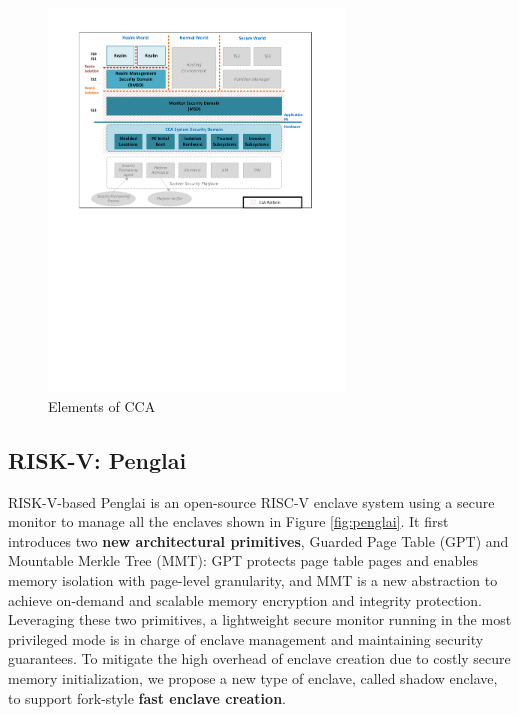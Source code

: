 \documentclass[lang=en]{sjtuarticle}
\begin{document}
\begin{figure}[h]
    \centering
    \includegraphics[width=0.7\textwidth]{cca.pdf}
    \caption{Elements of CCA \cite{armcca}}
    \label{fig:cca}
\end{figure}

\subsection{RISK-V: Penglai}

RISK-V-based Penglai \cite{penglai} is an open-source RISC-V enclave system using
a secure monitor to manage all the enclaves shown in Figure \ref{fig:penglai}. It first introduces two \textbf{new architectural
primitives}, Guarded Page Table (GPT) and Mountable
Merkle Tree (MMT): GPT protects page table pages and
enables memory isolation with page-level granularity, and
MMT is a new abstraction to achieve on-demand and scalable
memory encryption and integrity protection. Leveraging these
two primitives, a lightweight secure monitor running in the
most privileged mode is in charge of enclave management
and maintaining security guarantees. To mitigate the high
overhead of enclave creation due to costly secure memory initialization,
we propose a new type of enclave, called shadow
enclave, to support fork-style \textbf{fast enclave creation}.
\end{document}
